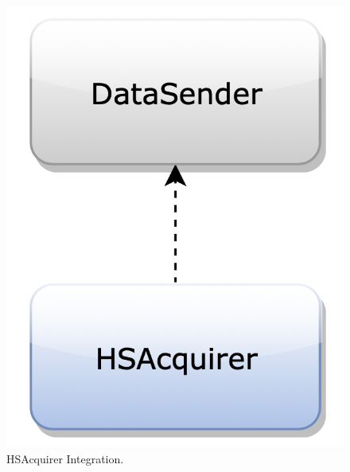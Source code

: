\begin{figure}[H]
\begin{center}
\begin{minipage}[c]{.40\textwidth}
\includegraphics[scale=0.35]{Images/IntegrationPlanImages/fig10.png}
\caption{HSAcquirer Integration.}
        \end{minipage}
      \end{center}
\end{figure}

\newpage

